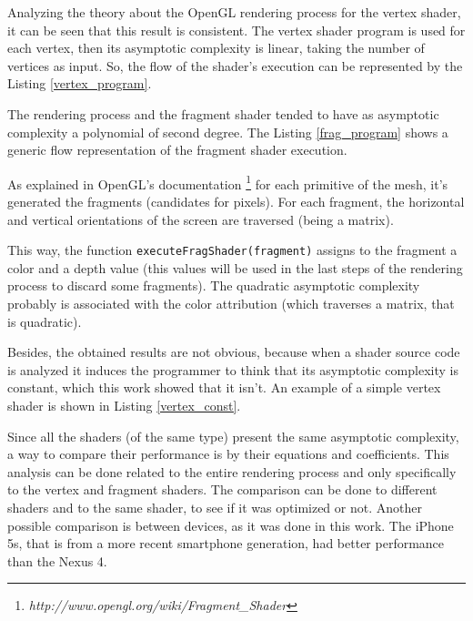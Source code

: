 \documentclass[10pt, conference, compsocconf]{IEEEtran}
\begin{document}
Analyzing the theory about the OpenGL rendering process for the vertex shader,
it can be seen that this result is consistent. The vertex shader program
is used for each vertex, then its asymptotic complexity is linear, taking the number of vertices as input. So,
the flow of the shader's execution can be represented by the Listing \ref{vertex_program}.



The rendering process and the fragment shader tended to have as
asymptotic complexity a polynomial of second degree. The Listing \ref{frag_program}
shows a generic flow representation of the fragment shader execution.



As explained in OpenGL's documentation
\footnote{\textit{http://www.opengl.org/wiki/Fragment\_Shader}}
 for each primitive of the mesh, it's generated the fragments (candidates
for pixels). For each fragment, the horizontal and vertical orientations
of the screen are traversed (being a matrix).

This way, the function \texttt{executeFragShader(fragment)} assigns
to the fragment a color and a depth value (this values will be used in
the last steps of the rendering process to discard some fragments). 
The quadratic asymptotic complexity probably is associated with 
the color attribution (which traverses a matrix, that is quadratic).

Besides, the obtained results are not obvious, because when a shader source code
is analyzed it induces the programmer to think that its asymptotic complexity
is constant, which this work showed that it isn't. An example of a simple 
vertex shader is shown in Listing \ref{vertex_const}.



Since all the shaders (of the same type) present the same asymptotic 
complexity, a way to compare their performance is by their equations
and coefficients. This analysis can be done related to the entire 
rendering process and only specifically to the vertex and fragment
shaders.  The comparison can be done to different shaders and to
the same shader, to see if it was optimized or not. Another possible comparison 
is between devices, as it was done in this work. The iPhone 5s, that is from a more recent smartphone generation, had
better performance than the Nexus 4.
\end{document}

